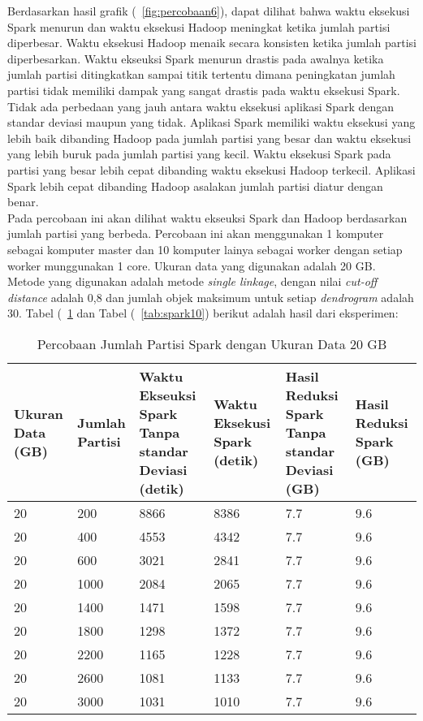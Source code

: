 Berdasarkan hasil grafik (~\ref{fig:percobaan6}), dapat dilihat bahwa waktu eksekusi Spark menurun dan waktu eksekusi Hadoop meningkat ketika jumlah partisi diperbesar. Waktu eksekusi Hadoop menaik secara konsisten ketika jumlah partisi diperbesarkan. Waktu ekseuksi Spark menurun drastis pada awalnya ketika jumlah partisi ditingkatkan sampai titik tertentu dimana peningkatan jumlah partisi tidak memiliki dampak yang sangat drastis pada waktu eksekusi Spark. Tidak ada perbedaan yang jauh antara waktu eksekusi aplikasi Spark dengan standar deviasi maupun yang tidak. Aplikasi Spark memiliki waktu eksekusi yang lebih baik dibanding Hadoop pada jumlah partisi yang besar dan waktu eksekusi yang lebih buruk pada jumlah partisi yang kecil. Waktu eksekusi Spark pada partisi yang besar lebih cepat dibanding waktu eksekusi Hadoop terkecil. Aplikasi Spark lebih cepat dibanding Hadoop asalakan jumlah partisi diatur dengan benar.\\




Pada percobaan ini akan dilihat waktu ekseuksi Spark dan Hadoop berdasarkan jumlah partisi yang berbeda. Percobaan ini akan menggunakan 1 komputer sebagai komputer master dan 10 komputer lainya sebagai worker dengan setiap worker munggunakan 1 core. Ukuran data yang digunakan adalah 20 GB. Metode yang digunakan adalah metode \textit{single linkage}, dengan nilai \textit{cut-off distance} adalah 0,8 dan jumlah objek maksimum untuk setiap \textit{dendrogram} adalah 30. Tabel (~\ref{tab:spark9} dan Tabel (~\ref{tab:spark10}) berikut adalah hasil dari eksperimen:

\begin{table}[H] 
	\centering 
	\caption{Percobaan Jumlah Partisi Spark dengan Ukuran Data 20 GB}
	\label{tab:spark9}
	\begin{tabular}{|p{1cm}|p{1cm}|p{3cm}|p{3cm}|p{3cm}|p{3cm}|}
\hline
Ukuran Data (GB) & Jumlah Partisi &  Waktu Ekseuksi Spark Tanpa standar Deviasi (detik) & Waktu Eksekusi Spark (detik) & Hasil Reduksi Spark Tanpa standar Deviasi (GB) & Hasil Reduksi Spark (GB)  \\ 
\hline
20 & 200 & 8866  & 8386  & 7.7 & 9.6 \\
\hline
20 & 400 & 4553  & 4342  & 7.7 & 9.6 \\
\hline
20 & 600 & 3021  & 2841  &  7.7 & 9.6 \\
\hline
20 & 1000 & 2084  & 2065  & 7.7 & 9.6 \\
\hline
20 & 1400 & 1471  & 1598  & 7.7 & 9.6 \\
\hline
20 & 1800 & 1298  & 1372  & 7.7 & 9.6 \\
\hline
20 & 2200 & 1165  & 1228  & 7.7 & 9.6 \\
\hline
20 & 2600 & 1081  & 1133  & 7.7 & 9.6 \\
\hline
20 & 3000 & 1031  & 1010  & 7.7 & 9.6 \\
\hline

\hline

	\end{tabular} 
\end{table}



